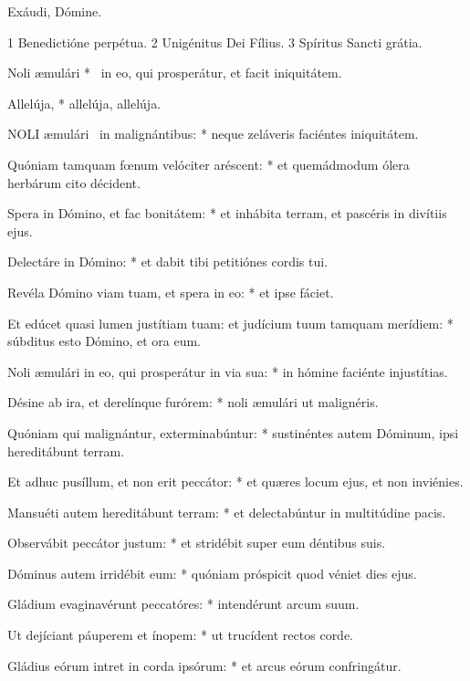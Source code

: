  Exáudi, Dómine.

 1 Benedictióne perpétua. 2 Unigénitus Dei Fílius. 3 Spíritus Sancti grátia.



 Noli æmulári * \textdagger\ in eo, qui prosperátur, et facit iniquitátem.


 Allelúja, * allelúja, allelúja.


\lettrine[lines=2]{N}{OLI} æmulári \textdagger\ in malignántibus: * neque zeláveris faciéntes iniquitátem.

Quóniam tamquam fœnum velóciter aréscent: * et quemádmodum ólera herbárum cito décident.

Spera in Dómino, et fac bonitátem: * et inhábita terram, et pascéris in divítiis ejus.

Delectáre in Dómino: * et dabit tibi petitiónes cordis tui.

Revéla Dómino viam tuam, et spera in eo: * et ipse fáciet.

Et edúcet quasi lumen justítiam tuam: et judícium tuum tamquam merídiem: * súbditus esto Dómino, et ora eum.

Noli æmulári in eo, qui prosperátur in via sua: * in hómine faciénte injustítias.

Désine ab ira, et derelínque furórem: * noli æmulári ut malignéris.

Quóniam qui malignántur, exterminabúntur: * sustinéntes autem Dóminum, ipsi hereditábunt terram.

Et adhuc pusíllum, et non erit peccátor: * et quæres locum ejus, et non inviénies.

Mansuéti autem hereditábunt terram: * et delectabúntur in multitúdine pacis.

Observábit peccátor justum: * et stridébit super eum déntibus suis.

Dóminus autem irridébit eum: * quóniam próspicit quod véniet dies ejus.

Gládium evaginavérunt peccatóres: * intendérunt arcum suum.

Ut dejíciant páuperem et ínopem: * ut trucídent rectos corde.

Gládius eórum intret in corda ipsórum: * et arcus eórum confringátur.

